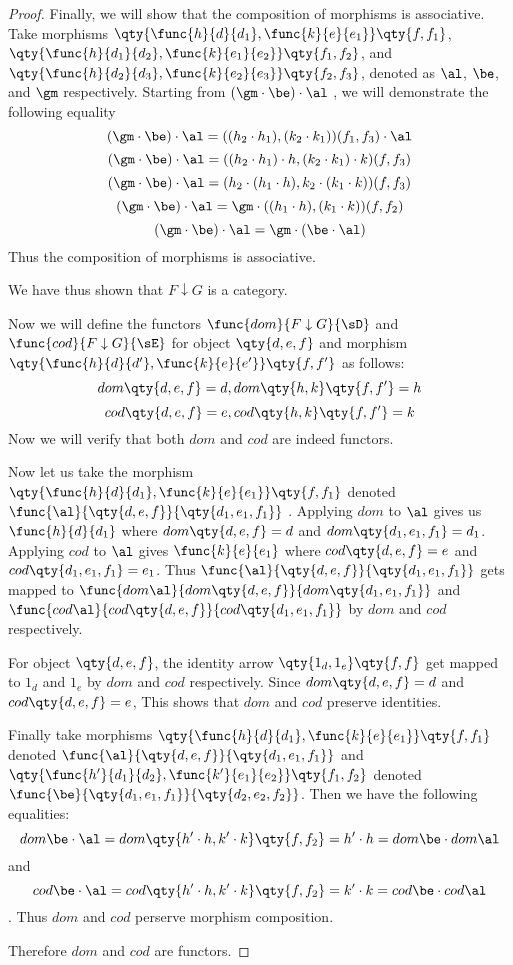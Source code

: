 \documentclass[main.tex]{subfiles}
\begin{document}
\begin{proof}
	Finally, we will show that the composition of morphisms is associative. Take
	morphisms
	$\qty{\func{h}{d}{d_1},\func{k}{e}{e_1}} \qty{f,f_1}$,
	$\qty{\func{h}{d_1}{d_2},\func{k}{e_1}{e_2}} \qty{f_1,f_2}$, and
	$\qty{\func{h}{d_2}{d_3},\func{k}{e_2}{e_3}} \qty{f_2,f_3}$, denoted as
	$\al$, $\be$, and $\gm$ respectively. Starting from $(\gm \cdot \be) \cdot
	\al$ , we will demonstrate the following equality
	\[(\gm\cdot\be)\cdot\al=((h_2\cdot h_1),(k_2\cdot k_1))(f_1,f_3) \cdot \al\]
	\[(\gm\cdot\be)\cdot\al=((h_2\cdot h_1)\cdot h,(k_2\cdot k_1)\cdot k)(f,f_3)\]
	\[(\gm\cdot\be)\cdot\al=(h_2\cdot(h_1\cdot h),k_2\cdot(k_1\cdot k))(f,f_3)\]
	\[(\gm\cdot\be)\cdot\al=\gm\cdot((h_1\cdot h),(k_1\cdot k))(f,f_2)\]
	\[(\gm\cdot\be)\cdot\al=\gm\cdot(\be \cdot \al)\] Thus the
	composition of morphisms is associative.

	We have thus shown that $F \downarrow G$ is a category.

	Now we will define the functors $\func{dom}{F \downarrow G}{\sD}$ and
	$\func{cod}{F \downarrow G}{\sE}$ for object $\qty{d,e,f}$ and morphism
	$\qty{\func{h}{d}{d'},\func{k}{e}{e'}} \qty{f,f'}$ as follows:
	\[ dom\qty{d,e,f} = d, dom\qty{h,k}\qty{f,f'} = h \]
	\[  cod\qty{d,e,f} = e, cod\qty{h,k}\qty{f,f'} = k \] Now we will verify
	that both $dom$ and $cod$ are indeed functors.

	Now let us take the morphism $\qty{\func{h}{d}{d_1},\func{k}{e}{e_1}}
	\qty{f,f_1}$  denoted $\func{\al}{\qty{d,e,f}}{\qty{d_1,e_1,f_1}}$ .
	Applying $dom$ to $\al$ gives us $\func{h}{d}{d_{1}}$ where $dom\qty{d,e,f}
	= d$ and $dom\qty{d_1,e_1,f_1} = d_1$. Applying $cod$ to $\al$ gives
	$\func{k}{e}{e_{1}}$ where $cod\qty{d,e,f} = e$ and $cod\qty{d_1,e_1,f_1} =
	e_1$. Thus $\func{\al}{\qty{d,e,f}}{\qty{d_1,e_1,f_1}}$ gets mapped to
	$\func{dom\al}{dom\qty{d,e,f}}{dom\qty{d_1,e_1,f_1}}$ and
	$\func{cod\al}{cod\qty{d,e,f}}{cod\qty{d_1,e_1,f_1}}$ by $dom$ and $cod$
	respectively.

	For object $\qty{d,e,f}$, the identity arrow $\qty{1_{d},1_{e}}\qty{f,f}$
	get mapped to $1_d$ and $1_e$ by $dom$ and $cod$ respectively. Since
	$dom\qty{d,e,f} = d$ and $cod\qty{d,e,f} = e$, This shows that $dom$ and
	$cod$ preserve identities.

	Finally take morphisms $\qty{\func{h}{d}{d_1},\func{k}{e}{e_1}} \qty{f,f_1}$
	denoted $\func{\al}{\qty{d,e,f}}{\qty{d_1,e_1,f_1}}$ and
	$\qty{\func{h'}{d_1}{d_2},\func{k'}{e_1}{e_2}} \qty{f_1,f_2}$   denoted
	$\func{\be}{\qty{d_1,e_1,f_1}}{\qty{d_2,e_2,f_2}}$. Then we have the
	following equalities:
	\[dom\be \cdot \al = dom\qty{h' \cdot h,k' \cdot k}\qty{f,f_2} =h'
	\cdot h = dom\be \cdot dom\al\] and
	\[cod\be \cdot \al = cod \qty{h' \cdot h,k' \cdot k}\qty{f,f_2}=  k'
	\cdot k = cod\be \cdot cod\al\]. Thus $dom$ and $cod$ perserve morphism
	composition.

	Therefore $dom$ and $cod$ are functors.
\end{proof}
\end{document}
